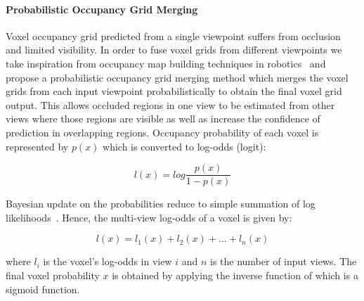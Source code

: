 \paragraph{Probabilistic Occupancy Grid Merging}


Voxel occupancy grid predicted from a single viewpoint suffers from occlusion and limited visibility.
In order to fuse voxel grids from different viewpoints we take inspiration from occupancy map building techniques in robotics~\cite{grisetti2007improved,konolige1997improved} and propose a probabilistic occupancy grid merging method which merges the voxel grids from each input viewpoint probabilistically to obtain the final voxel grid output.
This allows occluded regions in one view to be estimated from other views where those regions are visible as well as increase the confidence of prediction in overlapping regions.
Occupancy probability of each voxel is represented by $p(x)$ which is converted to log-odds (logit):

\begin{equation}
    l(x) = log \frac{p(x)}{1 - p(x)}
    \label{equ:logodds}
\end{equation}

Bayesian update on the probabilities reduce to simple summation of log likelihoods~\cite{konolige1997improved}. Hence, the multi-view log-odds of a voxel is given by:

\begin{equation}
    l(x) = l_1(x) + l_2(x) + ... + l_n(x)
    \label{equ:logodds_sum}
\end{equation}

\noindent where $l_i$ is the voxel's log-odds in view $i$ and $n$ is the number of input views.
The final voxel probability $x$ is obtained by applying the inverse function of  which is a sigmoid function.

